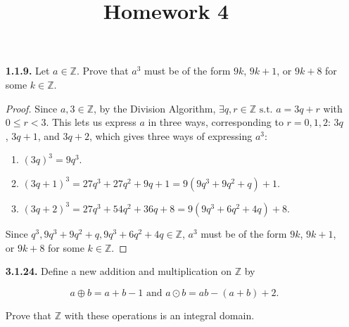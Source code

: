 \documentclass[12pt]{article}
\title{Homework 4}
\newcommand{\zee}{\mathbb{Z}}
\newcommand{\such}{\text{ s.t. }}
\begin{document}
\begin{itemize}
\item[\textbf{ 1.1.9.}] Let $a\in\zee$. Prove that $a^3$ must be of the form $9k$, $9k+1$, or $9k+8$ for some $k\in\zee$.

\begin{proof}
  Since $a, 3 \in \zee$, by the Division Algorithm, $\exists q, r \in \zee \such a=3q+r$ with $0\leq r <3$.
  This lets us express $a$ in three ways, corresponding to $r=0, 1, 2$: $3q$, $3q+1$, and $3q+2$, which gives three ways of expressing $a^3$:
  \begin{enumerate}
    \item ${(3q)}^3 = 9q^3$.
    \item ${(3q+1)}^3 = 27q^3+27q^2+9q+1 = 9(9q^3+9q^2+q)+1$.
    \item ${(3q+2)}^3 = 27q^3+54q^2+36q+8 = 9(9q^3+6q^2+4q)+8$.
  \end{enumerate}
  Since $q^3, 9q^3+9q^2+q, 9q^3+6q^2+4q \in \zee$, $a^3$ must be of the form $9k$, $9k+1$, or $9k+8$ for some $k\in\zee$.
\end{proof}

\item[\textbf{ 3.1.24.}] Define a new addition and multiplication on $\zee$ by

\[a\oplus b=a+b-1 \text{ and } a\odot b=ab-(a+b)+2.\]

Prove that $\zee$ with these operations is an integral domain.


\end{itemize}
\end{document}
